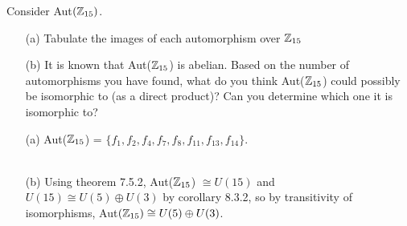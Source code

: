 \documentclass[titlepage]{article}
\begin{document}
\begin{problem}{10}
Consider Aut$(\mathbb{Z}_{15})$.
\begin{itemize}
\item[(a)] Tabulate the images of each automorphism over $\mathbb{Z}_{15}$
\item[(b)] It is known that Aut($\mathbb{Z}_{15}$) is abelian. Based on the number of automorphisms you have found, what do you think Aut($\mathbb{Z}_{15}$) could possibly be isomorphic to (as a direct product)? Can you determine which one it is isomorphic to?
\end{itemize}
\end{problem}
\begin{solution}
\begin{itemize}
\item[(a)] Aut($\mathbb{Z}_{15}$) = $\{f_1, f_2, f_4, f_7, f_8, f_{11}, f_{13}, f_{14}\}$.
\\ \\
\item[(b)] Using theorem 7.5.2, Aut($\mathbb{Z}_{15}$)  $\cong U(15)$ and $U(15) \cong U(5)\oplus U(3)$ by corollary 8.3.2, so by transitivity of isomorphisms, Aut$(\mathbb{Z}_{15}) \cong U(5)\oplus U(3)$.
\end{itemize}
\end{solution}
\end{document}
